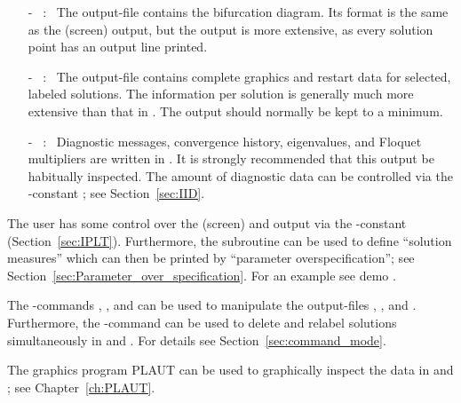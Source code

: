 \begin{itemize}
\item[-] ~:~ 
  The  output-file contains the bifurcation diagram.
  Its format is the same as the  (screen) output, 
  but the  output is more extensive, as every solution point has 
  an output line printed.
\item[-] ~:~ 
  The  output-file contains complete graphics and restart data
  for selected, labeled solutions. 
  The information per solution is generally much more extensive than
  that in . 
  The  output should normally be kept to a minimum.
\item[-] ~:~
  Diagnostic messages, convergence history, eigenvalues, and 
  Floquet multipliers are written in .
  It is strongly recommended that this output be habitually inspected.
  The amount of diagnostic data can be controlled via the \AUTO-constant ;
  see Section~\ref{sec:IID}.
\end{itemize}

The user has some control over the  (screen) and  output 
via the \AUTO-constant  (Section~\ref{sec:IPLT}).
Furthermore, the subroutine  can be used to define ``solution measures''
which can then be printed by ``parameter overspecification'';
see Section~\ref{sec:Parameter_over_specification}.
For an example see demo .

The \AUTO-commands , , and  can be used 
to manipulate  the output-files , ,
and .
Furthermore, the \AUTO-command  can be used to delete and
relabel solutions simultaneously in  and .
For details see Section~\ref{sec:command_mode}.

The graphics program {\cal PLAUT} can be used to graphically inspect 
the data in  and ; see Chapter~\ref{ch:PLAUT}.
 
